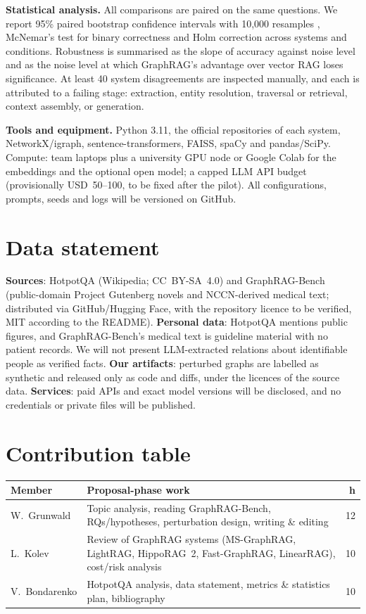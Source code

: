 \documentclass[11pt]{article}
\begin{document}
\textbf{Statistical analysis.} All comparisons are paired on the same questions. We report 95\% paired bootstrap confidence intervals with 10,000 resamples \cite{koehn2004bootstrap}, McNemar's test for binary correctness and Holm correction across systems and conditions. Robustness is summarised as the slope of accuracy against noise level and as the noise level at which GraphRAG's advantage over vector RAG loses significance. At least 40 system disagreements are inspected manually, and each is attributed to a failing stage: extraction, entity resolution, traversal or retrieval, context assembly, or generation.

\textbf{Tools and equipment.} Python 3.11, the official repositories of each system, NetworkX/igraph, sentence-transformers, FAISS, spaCy and pandas/SciPy. Compute: team laptops plus a university GPU node or Google Colab for the embeddings and the optional open model; a capped LLM API budget (provisionally USD~50--100, to be fixed after the pilot). All configurations, prompts, seeds and logs will be versioned on GitHub.

\section{Data statement}
\label{sec:data}
\textbf{Sources}: HotpotQA \cite{yang2018hotpotqa} (Wikipedia; CC~BY-SA~4.0) and GraphRAG-Bench \cite{xiang2026when} (public-domain Project Gutenberg novels and NCCN-derived medical text; distributed via GitHub/Hugging Face, with the repository licence to be verified, MIT according to the README).
\textbf{Personal data}: HotpotQA mentions public figures, and GraphRAG-Bench's medical text is guideline material with no patient records. We will not present LLM-extracted relations about identifiable people as verified facts.
\textbf{Our artifacts}: perturbed graphs are labelled as synthetic and released only as code and diffs, under the licences of the source data.
\textbf{Services}: paid APIs and exact model versions will be disclosed, and no credentials or private files will be published.

\section{Contribution table}
\label{sec:contrib}
{\small
\begin{tabularx}{\columnwidth}{@{}lXr@{}}
\toprule
Member & Proposal-phase work & h \\
\midrule
W.~Grunwald & Topic analysis, reading GraphRAG-Bench, RQs/hypotheses, perturbation design, writing \& editing & 12 \\
L.~Kolev & Review of GraphRAG systems (MS-GraphRAG, LightRAG, HippoRAG~2, Fast-GraphRAG, LinearRAG), cost/risk analysis & 10 \\
V.~Bondarenko & HotpotQA analysis, data statement, metrics \& statistics plan, bibliography & 10 \\
\bottomrule
\end{tabularx}
}
\end{document}
